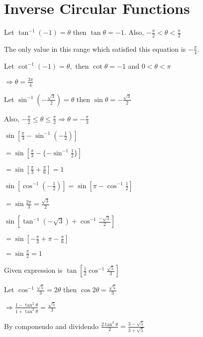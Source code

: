 \chapter{Inverse Circular Functions}
\startitemize[n]
\item Let $\tan^{-1}(-1) = \theta$ then $\tan\theta = -1.$ Also, $-\frac{\pi}{2}< \theta < \frac{\pi}{2}$

  The only value in this range which satisfied this equation is $-\frac{\pi}{4}.$

\item Let $\cot^{-1}(-1) = \theta,$ then $\cot\theta = -1$ and $0<\theta<\pi$

  $\Rightarrow \theta = \frac{3\pi}{4}$

\item Let $\sin^{-1}\left(-\frac{\sqrt{3}}{2}\right) = \theta$ then $\sin\theta = -\frac{\sqrt{3}}{2}$

  Also, $-\frac{\pi}{2}\leq \theta\leq \frac{\pi}{2} \Rightarrow \theta = -\frac{\pi}{3}$

\item $\sin\left[\frac{\pi}{3} -\sin^{-1}\left(-\frac{1}{2}\right)\right]$

  $=\sin\left[\frac{\pi}{3} -\{-\sin^{-1}\frac{1}{2}\}\right]$

  $= \sin\left[\frac{\pi}{3} + \frac{\pi}{6}\right] = 1$

\item $\sin\left[\cos^{-1}\left(-\frac{1}{2}\right)\right] = \sin\left[\pi - \cos^{-1}\frac{1}{2}\right]$

  $= \sin\frac{2\pi}{3} = \frac{\sqrt{3}}{2}$

\item $\sin\left[\tan^{-1}(-\sqrt{3}) + \cos^{-1}\frac{-\sqrt{3}}{2}\right]$

  $= \sin\left[-\frac{\pi}{3} + \pi- \frac{\pi}{6}\right]$

  $= \sin\frac{\pi}{2} = 1$

\item Given expression is $\tan\left[\frac{1}{2}\cos^{-1}\frac{\sqrt{5}}{3}\right]$

  Let $\cos^{-1}\frac{\sqrt{5}}{3} = 2\theta$ then $\cos2\theta = \frac{\sqrt{5}}{3}$

  $\Rightarrow \frac{1 - \tan^2\theta}{1 + \tan^2\theta} = \frac{\sqrt{5}}{3}$

  By componendo and dividendo $\frac{2\tan^2\theta}{2} = \frac{3 - \sqrt{5}}{3 + \sqrt{5}}$

